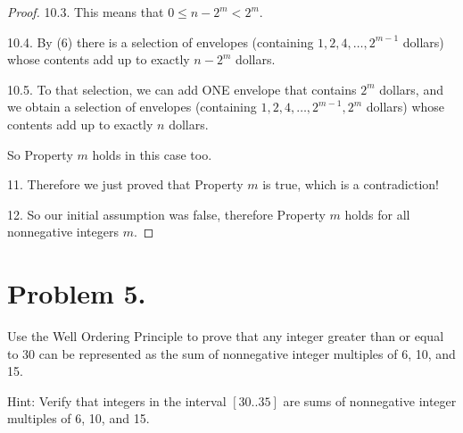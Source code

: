 \documentclass[14pt]{extarticle}
\begin{document}
\begin{proof}
10.3. This means that $0 \leq n - 2^m < 2^m$.

10.4. By (6) there is a selection of envelopes (containing $1, 2, 4, \ldots, 2^{m-1}$ dollars) whose contents add up to exactly $n - 2^m$ dollars.

10.5. To that selection, we can add ONE envelope that contains $2^m$ dollars, and we obtain a selection of envelopes (containing $1, 2, 4, \ldots, 2^{m-1}, 2^m$ dollars) whose contents add up to exactly $n$ dollars.

So Property $m$ holds in this case too.

11. Therefore we just proved that Property $m$ is true, which is a contradiction!

12. So our initial assumption was false, therefore Property $m$ holds for all nonnegative integers $m$.
\end{proof}

\section{Problem 5.} Use the Well Ordering Principle to prove that any integer greater than or equal to 30 can be represented as the sum of nonnegative integer multiples of 6, 10, and 15.

Hint: Verify that integers in the interval $[30..35]$ are sums of nonnegative integer multiples of 6, 10, and 15.
\end{document}
